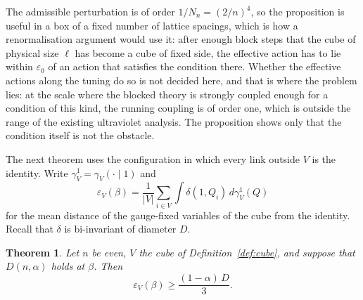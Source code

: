 \documentclass[aps,prd,twocolumn,superscriptaddress,nofootinbib,longbibliography,floatfix,amsmath,amssymb,10pt]{revtex4-2}
\newtheorem{theorem}{Theorem}
\theoremstyle{definition}
\theoremstyle{remark}
\begin{document}
The admissible perturbation is of order $1/N_n=(2/n)^4$, so the proposition
is useful in a box of a fixed number of lattice spacings, which is how a
renormalisation argument would use it: after enough block steps that the
cube of physical size $\ell$ has become a cube of fixed side, the effective
action has to lie within $\varepsilon_0$ of an action that satisfies the
condition there. Whether the effective actions along the tuning do so is
not decided here, and that is where the problem lies: at the scale where
the blocked theory is strongly coupled enough for a condition of this kind,
the running coupling is of order one, which is outside the range of the
existing ultraviolet analysis. The proposition shows only that the
condition itself is not the obstacle.

The next theorem uses the configuration in which every link outside $V$ is
the identity. Write $\gamma^1_V=\gamma_V(\cdot\mid1)$ and
\[
\varepsilon_V(\beta)=\frac1{|V|}\sum_{i\in V}\int\delta(1,Q_i)\,
d\gamma^1_V(Q)
\]
for the mean distance of the gauge-fixed variables of the cube from the
identity. Recall that $\delta$ is bi-invariant of diameter $D$.

\begin{theorem}\label{thm:cubeneeds}
Let $n$ be even, $V$ the cube of Definition~\ref{def:cube}, and suppose that
$D(n,\alpha)$ holds at $\beta$. Then
\[
\varepsilon_V(\beta)\ge\frac{(1-\alpha)\,D}3 .
\]
\end{theorem}
\end{document}
